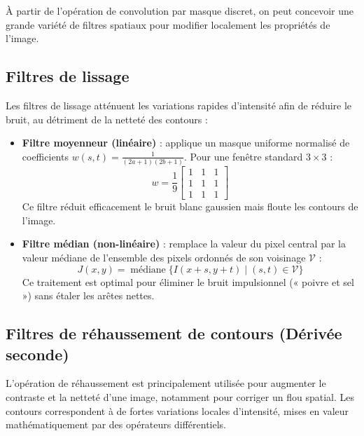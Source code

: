 À partir de l'opération de convolution par masque discret, on peut concevoir une grande variété de filtres spatiaux pour modifier localement les propriétés de l'image.

\subsection{Filtres de lissage}

Les filtres de lissage atténuent les variations rapides d'intensité afin de réduire le bruit, au détriment de la netteté des contours :
\begin{itemize}
    \item \textbf{Filtre moyenneur (linéaire)} : applique un masque uniforme normalisé de coefficients $w(s,t) = \frac{1}{(2a+1)(2b+1)}$. Pour une fenêtre standard $3 \times 3$ :
        \begin{equation}
            w = \frac{1}{9} \begin{bmatrix} 1 & 1 & 1 \\ 1 & 1 & 1 \\ 1 & 1 & 1 \end{bmatrix}
        \end{equation}
        Ce filtre réduit efficacement le bruit blanc gaussien mais floute les contours de l'image.
    \item \textbf{Filtre médian (non-linéaire)} : remplace la valeur du pixel central par la valeur médiane de l'ensemble des pixels ordonnés de son voisinage $\mathcal{V}$ :
        \begin{equation}
            J(x,y) = \operatorname{médiane}\{ I(x+s, y+t) \mid (s,t) \in \mathcal{V} \}
        \end{equation}
        Ce traitement est optimal pour éliminer le bruit impulsionnel (« poivre et sel ») sans étaler les arêtes nettes.
\end{itemize}

\subsection{Filtres de réhaussement de contours (Dérivée seconde)}

L'opération de réhaussement est principalement utilisée pour augmenter le contraste et la netteté d'une image, notamment pour corriger un flou spatial. Les contours correspondent à de fortes variations locales d'intensité, mises en valeur mathématiquement par des opérateurs différentiels.


